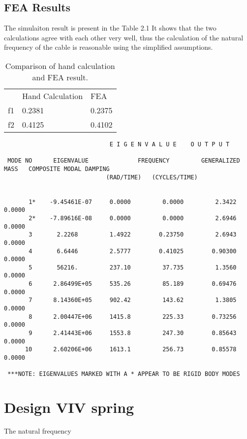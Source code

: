 \documentclass[paper=a4, fontsize=11pt]{scrartcl} %
\numberwithin{equation}{section} %
\numberwithin{figure}{section} %
\numberwithin{table}{section} %
\begin{document}
\subsection{FEA Results}
\label{sec:fea-results}

The simulaiton result is present in the Table 2.1 It shows that the two
calculations agree with each other very well, thus the calculation of
the natural frequency of the cable is reasonable using the simplified
assumptions.

\begin{table}
  \centering
  \begin{tabular}{lll}
    \hline    
   & Hand Calculation &FEA \\
   f1&	0.2381&	0.2375 \\
    f2&	0.4125&	0.4102 \\
    \hline
  \end{tabular}
  \caption{Comparison of hand calculation and FEA result.}
\end{table}

\newpage
\begin{sidewaysfigure}
\begin{verbatim}
                              E I G E N V A L U E    O U T P U T     

 MODE NO      EIGENVALUE              FREQUENCY         GENERALIZED MASS   COMPOSITE MODAL DAMPING            
                             (RAD/TIME)   (CYCLES/TIME)


       1*    -9.45461E-07     0.0000         0.0000         2.3422         0.0000    
       2*    -7.89616E-08     0.0000         0.0000         2.6946         0.0000    
       3       2.2268         1.4922        0.23750         2.6943         0.0000    
       4       6.6446         2.5777        0.41025        0.90300         0.0000    
       5       56216.         237.10         37.735         1.3560         0.0000    
       6      2.86499E+05     535.26         85.189        0.69476         0.0000    
       7      8.14360E+05     902.42         143.62         1.3805         0.0000    
       8      2.00447E+06     1415.8         225.33        0.73256         0.0000    
       9      2.41443E+06     1553.8         247.30        0.85643         0.0000    
      10      2.60206E+06     1613.1         256.73        0.85578         0.0000    

 ***NOTE: EIGENVALUES MARKED WITH A * APPEAR TO BE RIGID BODY MODES
\end{verbatim}
\end{sidewaysfigure}

\section{Design VIV spring}
\label{sec:design-viv-spring}

The natural frequency 
\end{document}

